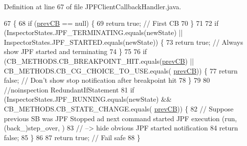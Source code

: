 Definition at line 67 of file J\+P\+F\+Client\+Callback\+Handler.\+java.


\begin{DoxyCode}
67                                                                                                           \{
68     \textcolor{keywordflow}{if} (\hyperlink{classgov_1_1nasa_1_1jpf_1_1inspector_1_1client_1_1_j_p_f_client_callback_handler_a1e5272638212d9246e98ced9a5a78012}{prevCB} == null) \{
69       \textcolor{keywordflow}{return} \textcolor{keyword}{true}; \textcolor{comment}{// First CB}
70     \}
71 
72     \textcolor{keywordflow}{if} (InspectorStates.JPF\_TERMINATING.equals(newState) || InspectorStates.JPF\_STARTED.equals(newState)) \{
73       \textcolor{keywordflow}{return} \textcolor{keyword}{true}; \textcolor{comment}{// Always show JPF started and terminating}
74     \}
75 
76     \textcolor{keywordflow}{if} (CB\_METHODS.CB\_BREAKPOINT\_HIT.equals(\hyperlink{classgov_1_1nasa_1_1jpf_1_1inspector_1_1client_1_1_j_p_f_client_callback_handler_a1e5272638212d9246e98ced9a5a78012}{prevCB}) || CB\_METHODS.CB\_CG\_CHOICE\_TO\_USE.equals(
      \hyperlink{classgov_1_1nasa_1_1jpf_1_1inspector_1_1client_1_1_j_p_f_client_callback_handler_a1e5272638212d9246e98ced9a5a78012}{prevCB})) \{
77       \textcolor{keywordflow}{return} \textcolor{keyword}{false}; \textcolor{comment}{// Don't show stop notification after breakpoint hit}
78     \}
79 
80     \textcolor{comment}{//noinspection RedundantIfStatement}
81     \textcolor{keywordflow}{if} (InspectorStates.JPF\_RUNNING.equals(newState) && CB\_METHODS.CB\_STATE\_CHANGE.equals(
      \hyperlink{classgov_1_1nasa_1_1jpf_1_1inspector_1_1client_1_1_j_p_f_client_callback_handler_a1e5272638212d9246e98ced9a5a78012}{prevCB})) \{
82       \textcolor{comment}{// Suppose previous SB was JPF Stopped ad next command started JPF execution (run, (back\_)step\_over,
       )}
83       \textcolor{comment}{// --> hide obvious JPF started notification}
84       \textcolor{keywordflow}{return} \textcolor{keyword}{false};
85     \}
86 
87     \textcolor{keywordflow}{return} \textcolor{keyword}{true}; \textcolor{comment}{// Fail safe}
88   \}
\end{DoxyCode}
